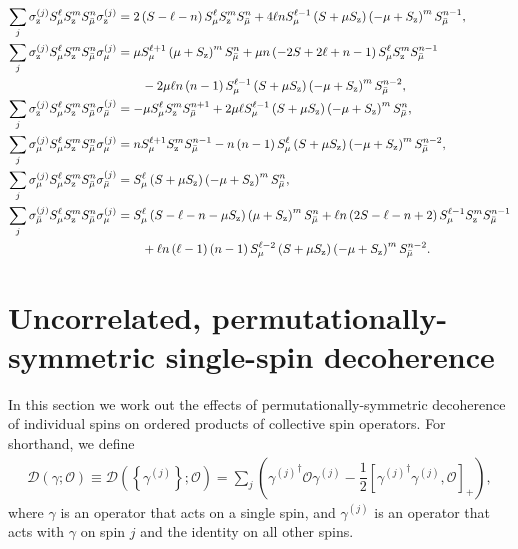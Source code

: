 \documentclass[aps,notitlepage,nofootinbib,11pt]{revtex4-1}
\newcommand{\f}[2]{\dfrac{#1}{#2}} %
\newcommand{\p}[1]{\left(#1\right)} %
\renewcommand{\sp}[1]{\left[#1\right]} %
\renewcommand{\set}[1]{\left\{#1\right\}} %
\newcommand{\D}{\mathcal{D}}
\renewcommand{\O}{\mathcal{O}}
\newcommand{\z}{\text{z}}
\newcommand{\bmu}{{\bar\mu}}
\newcommand{\1}{\mathds{1}}
\begin{document}
\begin{align}
  \sum_j \sigma_\z^{(j)} S_\mu^\ell S_\z^m S_\bmu^n \sigma_\z^{(j)}
  &= 2\p{S-\ell-n} S_\mu^\ell S_\z^m S_\bmu^n
  + 4\ell n S_\mu^{\ell-1} \p{S+\mu S_\z}
  \p{-\mu+S_\z}^m S_\bmu^{n-1},
  \label{eq:san_z_z} \allowdisplaybreaks \\
  \sum_j \sigma_\z^{(j)} S_\mu^\ell S_\z^m S_\bmu^n \sigma_\mu^{(j)}
  &= \mu S_\mu^{\ell+1} \p{\mu+S_\z}^m S_\bmu^n
  + \mu n \p{-2S+2\ell+n-1} S_\mu^\ell S_\z^m S_\bmu^{n-1} \notag \\
  &\qquad - 2\mu\ell n\p{n-1} S_\mu^{\ell-1}
  \p{S+\mu S_\z} \p{-\mu+S_\z}^m S_\bmu^{n-2},
  \label{eq:san_z_mu} \allowdisplaybreaks \\
  \sum_j \sigma_\z^{(j)} S_\mu^\ell S_\z^m S_\bmu^n \sigma_\bmu^{(j)}
  &= -\mu S_\mu^\ell S_\z^m S_\bmu^{n+1}
  + 2\mu \ell S_\mu^{\ell-1} \p{S+\mu S_\z}\p{-\mu+S_\z}^m S_\bmu^n,
  \label{eq:san_z_bmu} \allowdisplaybreaks \\
  \sum_j \sigma_\mu^{(j)} S_\mu^\ell S_\z^m S_\bmu^n \sigma_\mu^{(j)}
  &= n S_\mu^{\ell+1} S_\z^m S_\bmu^{n-1}
  - n\p{n-1} S_\mu^\ell \p{S+\mu S_\z} \p{-\mu+S_\z}^m S_\bmu^{n-2},
  \label{eq:san_mu_mu} \allowdisplaybreaks \\
  \sum_j \sigma_\mu^{(j)} S_\mu^\ell S_\z^m S_\bmu^n \sigma_\bmu^{(j)}
  &= S_\mu^\ell \p{S+\mu S_\z}\p{-\mu+S_\z}^m S_\bmu^n,
  \label{eq:san_mu_bmu} \allowdisplaybreaks \\
  \sum_j \sigma_\bmu^{(j)} S_\mu^\ell S_\z^m S_\bmu^n \sigma_\mu^{(j)}
  &= S_\mu^\ell \p{S - \ell - n - \mu S_\z} \p{\mu + S_\z}^m S_\bmu^n
  + \ell n \p{2S - \ell - n + 2}
  S_\mu^{\ell-1} S_\z^m S_\bmu^{n-1} \notag \\
  &\qquad + \ell n \p{\ell-1} \p{n-1} S_\mu^{\ell-2} \p{S + \mu S_\z}
  \p{-\mu + S_\z}^m S_\bmu^{n-2}.
  \label{eq:san_bmu_mu}
\end{align}


\section{Uncorrelated, permutationally-symmetric single-spin
  decoherence}
\label{sec:decoherence_single}

In this section we work out the effects of permutationally-symmetric
decoherence of individual spins on ordered products of collective spin
operators.  For shorthand, we define
\begin{align}
  \D\p{\gamma;\O} \equiv \D\p{\set{\gamma^{(j)}};\O}
  = \sum_j\p{{\gamma^{(j)}}^\dag \O \gamma^{(j)}
    - \f12\sp{{\gamma^{(j)}}^\dag \gamma^{(j)}, \O}_+},
\end{align}
where $\gamma$ is an operator that acts on a single spin, and
$\gamma^{(j)}$ is an operator that acts with $\gamma$ on spin $j$ and
the identity on all other spins.
\end{document}
